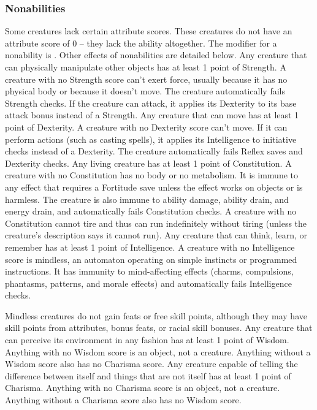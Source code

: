 \subsubsection{Nonabilities} Some creatures lack certain attribute scores. These creatures do not have an attribute score of 0 -- they lack the ability altogether. The modifier for a nonability is . Other effects of nonabilities are detailed below.
 Any creature that can physically manipulate other objects has at least 1 point of Strength. A creature with no Strength score can't exert force, usually because it has no physical body or because it doesn't move. The creature automatically fails Strength checks. If the creature can attack, it applies its Dexterity to its base attack bonus instead of a Strength.
 Any creature that can move has at least 1 point of Dexterity. A creature with no Dexterity score can't move. If it can perform actions (such as casting spells), it applies its Intelligence to initiative checks instead of a Dexterity. The creature automatically fails Reflex saves and Dexterity checks.
 Any living creature has at least 1 point of Constitution. A creature with no Constitution has no body or no metabolism. It is immune to any effect that requires a Fortitude save unless the effect works on objects or is harmless. The creature is also immune to ability damage, ability drain, and energy drain, and automatically fails Constitution checks. A creature with no Constitution cannot tire and thus can run indefinitely without tiring (unless the creature's description says it cannot run).
 Any creature that can think, learn, or remember has at least 1 point of Intelligence. A creature with no Intelligence score is mindless, an automaton operating on simple instincts or programmed instructions. It has immunity to mind-affecting effects (charms, compulsions, phantasms, patterns, and morale effects) and automatically fails Intelligence checks.
\par Mindless creatures do not gain feats or free skill points, although they may have skill points from attributes, bonus feats, or racial skill bonuses.
 Any creature that can perceive its environment in any fashion has at least 1 point of Wisdom. Anything with no Wisdom score is an object, not a creature. Anything without a Wisdom score also has no Charisma score.
 Any creature capable of telling the difference between itself and things that are not itself has at least 1 point of Charisma. Anything with no Charisma score is an object, not a creature. Anything without a Charisma score also has no Wisdom score.

